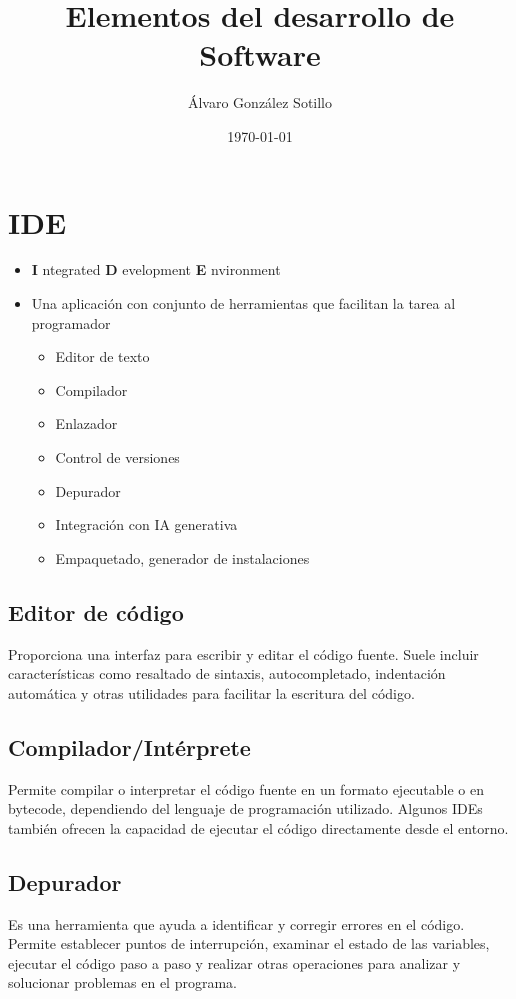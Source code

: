\documentclass[a4paper]{article}
\author{Álvaro González Sotillo}
\date{\today}
\title{Elementos del desarrollo de Software}
\begin{document}
\maketitle
\setcounter{tocdepth}{1}
\tableofcontents

\captionsetup{font=scriptsize}
\section{IDE}
\label{sec:org0000018}
\begin{itemize}
\item \textbf{I} ntegrated \textbf{D} evelopment \textbf{E} nvironment
\item Una aplicación con conjunto de herramientas que facilitan la tarea al programador
\begin{itemize}
\item Editor de texto
\item Compilador
\item Enlazador
\item Control de versiones
\item Depurador
\item Integración con IA generativa
\item Empaquetado, generador de instalaciones
\end{itemize}
\end{itemize}
\subsection{Editor de código}
\label{sec:org0000000}
Proporciona una interfaz para escribir y editar el código fuente. Suele incluir características como resaltado de sintaxis, autocompletado, indentación automática y otras utilidades para facilitar la escritura del código.
\subsection{Compilador/Intérprete}
\label{sec:org0000003}
Permite compilar o interpretar el código fuente en un formato ejecutable o en bytecode, dependiendo del lenguaje de programación utilizado. Algunos IDEs también ofrecen la capacidad de ejecutar el código directamente desde el entorno.
\subsection{Depurador}
\label{sec:org0000006}
Es una herramienta que ayuda a identificar y corregir errores en el código. Permite establecer puntos de interrupción, examinar el estado de las variables, ejecutar el código paso a paso y realizar otras operaciones para analizar y solucionar problemas en el programa.
\end{document}
